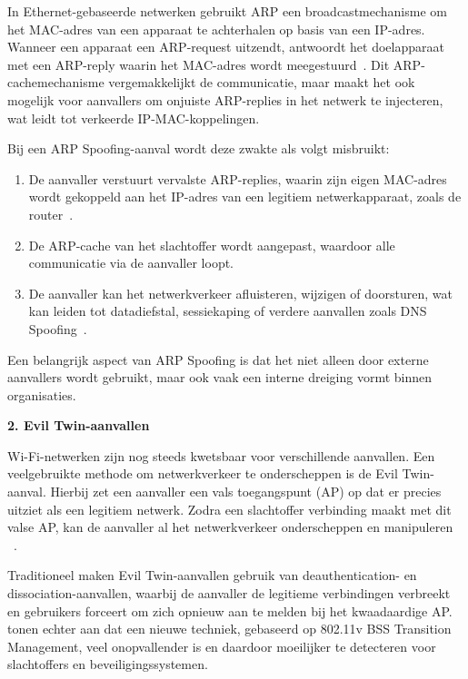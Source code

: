 \vspace{0.5cm}

In Ethernet-gebaseerde netwerken gebruikt ARP een broadcastmechanisme om het MAC-adres van een apparaat te achterhalen op basis van een IP-adres. 
Wanneer een apparaat een ARP-request uitzendt, antwoordt het doelapparaat met een ARP-reply waarin het MAC-adres wordt meegestuurd~\autocite{ARSLAN2017}. 
Dit ARP-cachemechanisme vergemakkelijkt de communicatie, maar maakt het ook mogelijk voor aanvallers om onjuiste ARP-replies in het netwerk te injecteren, wat leidt tot verkeerde IP-MAC-koppelingen.

\vspace{0.5cm}

Bij een ARP Spoofing-aanval wordt deze zwakte als volgt misbruikt:

\begin{enumerate}
    \item De aanvaller verstuurt vervalste ARP-replies, waarin zijn eigen MAC-adres wordt gekoppeld aan het IP-adres van een legitiem netwerkapparaat, zoals de router~\autocite{ARSLAN2017}.
    
    \item De ARP-cache van het slachtoffer wordt aangepast, waardoor alle communicatie via de aanvaller loopt.
    
    \item De aanvaller kan het netwerkverkeer afluisteren, wijzigen of doorsturen, wat kan leiden tot datadiefstal, sessiekaping of verdere aanvallen zoals DNS Spoofing~\autocite{ARSLAN2017}.
\end{enumerate}

Een belangrijk aspect van ARP Spoofing is dat het niet alleen door externe aanvallers wordt gebruikt, maar ook vaak een interne dreiging vormt binnen organisaties. 
\textcite{ARSLAN2017} 



\vspace{0.5cm}
\textbf{2. Evil Twin-aanvallen}

Wi-Fi-netwerken zijn nog steeds kwetsbaar voor verschillende aanvallen. Een veelgebruikte methode om netwerkverkeer te onderscheppen is de Evil Twin-aanval. Hierbij zet een aanvaller een vals toegangspunt (AP) op dat er precies uitziet als een legitiem netwerk. Zodra een slachtoffer verbinding maakt met dit valse AP, kan de aanvaller al het netwerkverkeer onderscheppen en manipuleren ~\autocite{LOUCA2023}.

Traditioneel maken Evil Twin-aanvallen gebruik van deauthentication- en dissociation-aanvallen, waarbij de aanvaller de legitieme verbindingen verbreekt en gebruikers forceert om zich opnieuw aan te melden bij het kwaadaardige AP.~\autocite{LOUCA2023} tonen echter aan dat een nieuwe techniek, gebaseerd op 802.11v BSS Transition Management, veel onopvallender is en daardoor moeilijker te detecteren voor slachtoffers en beveiligingssystemen.


